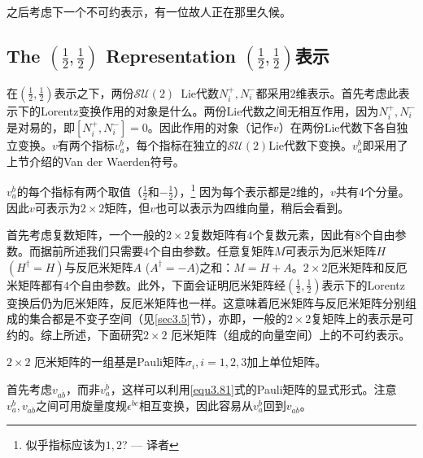 之后考虑下一个不可约表示，有一位故人正在那里久候。

\subsection[$(\frac{1}{2}, \frac{1}{2})$表示]{ The $( \frac{1}{2}, \frac{1}{2})$ Representation \quad $(\frac{1}{2}, \frac{1}{2})$表示}
\label{sec3.7.8}
在$(\frac{1}{2},  \frac{1}{2})$表示之下，两份$\mathcal{SU}(2)$\ Lie代数$N_i^+, N_i^-$都采用$2$维表示。首先考虑此表示下的Lorentz变换作用的对象是什么。两份Lie代数之间无相互作用，因为$N_i^+, N_i^-$是对易的，即$[N_i^+, N_i^-] = 0$。因此作用的对象（记作$v$）在两份Lie代数下各自独立变换。$v$有两个指标$v_a^{\dot{b}}$，每个指标在独立的$\mathcal{SU}(2)$Lie代数下变换。$v_a^{\dot{b}}$即采用了上节介绍的Van der Waerden符号。

$v_a^{\dot{b}}$的每个指标有两个取值（$\frac{1}{2}$和$-\frac{1}{2}$），\footnote{似乎指标应该为$1, 2$? --- 译者} 因为每个表示都是$2$维的，$v$共有$4$个分量。因此$v$可表示为$2 \times 2$矩阵，但$v$也可以表示为四维向量，稍后会看到。

首先考虑复数矩阵，一个一般的$2 \times 2$复数矩阵有$4$个复数元素，因此有$8$个自由参数。而据前所述我们只需要$4$个自由参数。任意复矩阵$M$可表示为厄米矩阵$H$$(H^\dag = H)$与反厄米矩阵$A$ ($A^\dag = -A$)之和：$M = H + A$。$2 \times 2$厄米矩阵和反厄米矩阵都有$4$个自由参数。此外，下面会证明厄米矩阵经$(\frac{1}{2}, \frac{1}{2})$表示下的Lorentz变换后仍为厄米矩阵，反厄米矩阵也一样。这意味着厄米矩阵与反厄米矩阵分别组成的集合都是不变子空间（见\ref{sec3.5}节），亦即，一般的$2 \times 2$复矩阵上的表示是可约的。综上所述，下面研究$2 \times 2$ 厄米矩阵（组成的向量空间）上的不可约表示。

$2 \times 2$ 厄米矩阵的一组基是Pauli矩阵$\sigma_i, i = 1, 2, 3$加上单位矩阵。

首先考虑$v_{a\dot{b}}$，而非$v_a^{\dot{b}}$，这样可以利用\ref{equ3.81}式的Pauli矩阵的显式形式。注意$v_a^{\dot{b}}, v_{a \dot{b}}$之间可用旋量度规$\epsilon^{\dot{bc}}$相互变换，因此容易从$v_a^{\dot{b}}$回到$v_{a \dot{b}}$。

